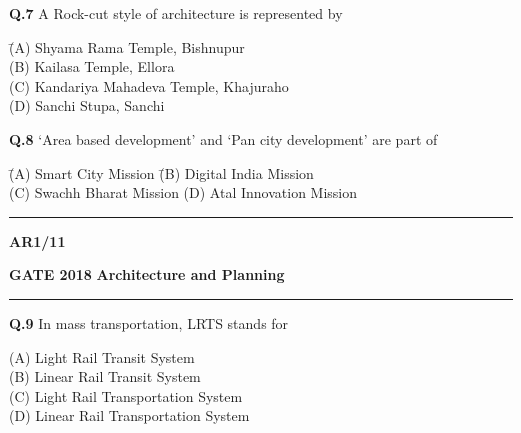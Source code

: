 \documentclass{article}
\begin{document}
\vspace{1.5em}

\noindent\textbf{Q.7} \hspace{0.5em} A Rock-cut style of architecture is represented by

\vspace{0.5em}

\begin{tabbing}
\hspace{2cm} \= (A) Shyama Rama Temple, Bishnupur \\
\> (B) Kailasa Temple, Ellora \\
\> (C) Kandariya Mahadeva Temple, Khajuraho \\
\> (D) Sanchi Stupa, Sanchi
\end{tabbing}

\vspace{1.5em}

\noindent\textbf{Q.8} \hspace{0.5em} ‘Area based development’ and ‘Pan city development’ are part of

\vspace{0.5em}

\begin{tabbing}
\hspace{2cm} \= (A) Smart City Mission \hspace{2cm} \= (B) Digital India Mission \\
\> (C) Swachh Bharat Mission \> (D) Atal Innovation Mission
\end{tabbing}

\vspace{1cm}

\vfill
\noindent\rule{\textwidth}{0.4pt} \textbf{AR}\hfill \textbf{1/11}

\vspace{0.006cm}

 \newpage
 
\noindent
\textbf{GATE 2018} \hfill \textbf{Architecture and Planning}
\vspace{0.0012cm} \hrule
 
\vspace{1cm}
\noindent \textbf{Q.9} \hspace{0.6cm} In mass transportation, LRTS stands for

\begin{flushleft}
\hspace{1.2cm}  (A) Light Rail Transit System\\
\hspace{1.2cm} (B) Linear Rail Transit System\\
\hspace{1.2cm} (C) Light Rail Transportation System\\
\hspace{1.2cm} (D) Linear Rail Transportation System
\end{flushleft}
\end{document}
